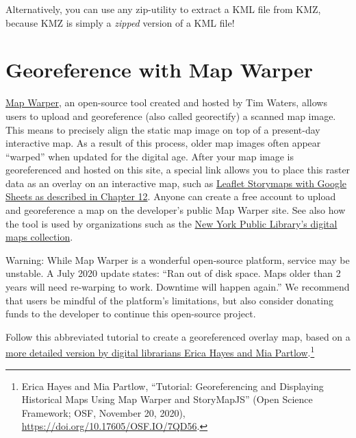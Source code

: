 \documentclass[
  english,
]{book}
\begin{document}
Alternatively, you can use any zip-utility to extract a KML file from KMZ, because KMZ is simply a \emph{zipped} version of a KML file!

\hypertarget{mapwarper}{%
\section*{Georeference with Map Warper}\label{mapwarper}}

\href{https://mapwarper.net}{Map Warper}, an open-source tool created and hosted by Tim Waters, allows users to upload and georeference (also called georectify) a scanned map image. This means to precisely align the static map image on top of a present-day interactive map. As a result of this process, older map images often appear ``warped'' when updated for the digital age. After your map image is georeferenced and hosted on this site, a special link allows you to place this raster data as an overlay on an interactive map, such as \href{leaflet-storymaps-with-google-sheets.html}{Leaflet Storymaps with Google Sheets as described in Chapter 12}. Anyone can create a free account to upload and georeference a map on the developer's public Map Warper site. See also how the tool is used by organizations such as the \href{http://maps.nypl.org}{New York Public Library's digital maps collection}.

Warning: While Map Warper is a wonderful open-source platform, service may be unstable. A July 2020 update states: ``Ran out of disk space. Maps older than 2 years will need re-warping to work. Downtime will happen again.'' We recommend that users be mindful of the platform's limitations, but also consider donating funds to the developer to continue this open-source project.

Follow this abbreviated tutorial to create a georeferenced overlay map, based on a \href{https://github.com/ericayhayes/georeferencingtutorial}{more detailed version by digital librarians Erica Hayes and Mia Partlow}.\footnote{Erica Hayes and Mia Partlow, {``Tutorial: {Georeferencing} and {Displaying Historical Maps} Using {Map Warper} and {StoryMapJS}''} ({Open Science Framework}; {OSF}, November 20, 2020), \url{https://doi.org/10.17605/OSF.IO/7QD56}.}
\end{document}
